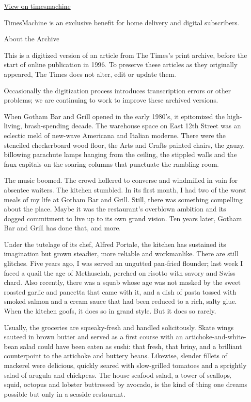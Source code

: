 \href{http://timesmachine.nytimes3xbfgragh.onion/timesmachine/1993/08/27/011693.html}{View
on timesmachine}

TimesMachine is an exclusive benefit for home delivery and digital
subscribers.

About the Archive

This is a digitized version of an article from The Times's print
archive, before the start of online publication in 1996. To preserve
these articles as they originally appeared, The Times does not alter,
edit or update them.

Occasionally the digitization process introduces transcription errors or
other problems; we are continuing to work to improve these archived
versions.

When Gotham Bar and Grill opened in the early 1980's, it epitomized the
high-living, brash-spending decade. The warehouse space on East 12th
Street was an eclectic meld of new-wave Americana and Italian moderne.
There were the stenciled checkerboard wood floor, the Arts and Crafts
painted chairs, the gauzy, billowing parachute lamps hanging from the
ceiling, the stippled walls and the faux capitals on the soaring columns
that punctuate the rambling room.

The music boomed. The crowd hollered to converse and windmilled in vain
for absentee waiters. The kitchen stumbled. In its first month, I had
two of the worst meals of my life at Gotham Bar and Grill. Still, there
was something compelling about the place. Maybe it was the restaurant's
overblown ambition and its dogged commitment to live up to its own grand
vision. Ten years later, Gotham Bar and Grill has done that, and more.

Under the tutelage of its chef, Alfred Portale, the kitchen has
sustained its imagination but grown steadier, more reliable and
workmanlike. There are still glitches. Five years ago, I was served an
ungutted pan-fried flounder; last week I faced a quail the age of
Methuselah, perched on risotto with savory and Swiss chard. Also
recently, there was a squab whose age was not masked by the sweet
roasted garlic and pancetta that came with it, and a dish of pasta
tossed with smoked salmon and a cream sauce that had been reduced to a
rich, salty glue. When the kitchen goofs, it does so in grand style. But
it does so rarely.

Usually, the groceries are squeaky-fresh and handled solicitously. Skate
wings sauteed in brown butter and served as a first course with an
artichoke-and-white-bean salad could have been eaten as sushi: that
fresh, that briny, and a brilliant counterpoint to the artichoke and
buttery beans. Likewise, slender fillets of mackerel were delicious,
quickly seared with slow-grilled tomatoes and a sprightly salad of
arugula and chickpeas. The house seafood salad, a tower of scallops,
squid, octopus and lobster buttressed by avocado, is the kind of thing
one dreams possible but only in a seaside restaurant.

